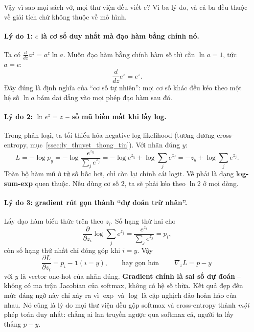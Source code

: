 Vậy vì sao mọi sách vở, mọi thư viện đều viết $e$? Vì ba lý do, và cả ba đều thuộc về giải tích chứ không thuộc về mô hình.

\paragraph{Lý do 1: $e$ là cơ số duy nhất mà đạo hàm bằng chính nó.} Ta có $\frac{d}{dz} a^z = a^z \ln a$. Muốn đạo hàm bằng chính hàm số thì cần $\ln a = 1$, tức $a = e$:
\[
\frac{d}{dz} e^z = e^z .
\]
Đây đúng là định nghĩa của “cơ số tự nhiên”: mọi cơ số khác đều kéo theo một hệ số $\ln a$ bám dai dẳng vào mọi phép đạo hàm sau đó.

\paragraph{Lý do 2: $\ln e^z = z$ -- số mũ biến mất khi lấy log.} Trong phân loại, ta tối thiểu hóa negative log-likelihood (tương đương cross-entropy, mục~\ref{ssec:ly_thuyet_thong_tin}). Với nhãn đúng $y$:
\[
L = -\log p_y = -\log \frac{e^{z_y}}{\sum_j e^{z_j}} = -\log e^{z_y} + \log \sum_j e^{z_j} = -z_y + \log \sum_j e^{z_j} .
\]
Toàn bộ hàm mũ ở tử số bốc hơi, chỉ còn lại chính cái logit. Vế phải là dạng \textbf{log-sum-exp} quen thuộc. Nếu dùng cơ số $2$, ta sẽ phải kéo theo $\ln 2$ ở mọi dòng.

\paragraph{Lý do 3: gradient rút gọn thành “dự đoán trừ nhãn”.} Lấy đạo hàm biểu thức trên theo $z_i$. Số hạng thứ hai cho
\[
\frac{\partial}{\partial z_i} \log \sum_j e^{z_j} = \frac{e^{z_i}}{\sum_j e^{z_j}} = p_i ,
\]
còn số hạng thứ nhất chỉ đóng góp khi $i = y$. Vậy
\[
\frac{\partial L}{\partial z_i} = p_i - \mathbf{1}(i = y), \qquad \text{hay gọn hơn} \qquad \boxed{\ \nabla_z L = p - y\ }
\]
với $y$ là vector one-hot của nhãn đúng. \textbf{Gradient chính là sai số dự đoán} -- không có ma trận Jacobian của softmax, không có hệ số thừa. Kết quả đẹp đến mức đáng ngờ này chỉ xảy ra vì $\exp$ và $\log$ là cặp nghịch đảo hoàn hảo của nhau. Nó cũng là lý do mọi thư viện đều gộp softmax và cross-entropy thành \emph{một} phép toán duy nhất: chẳng ai lan truyền ngược qua softmax cả, người ta lấy thẳng $p - y$.

